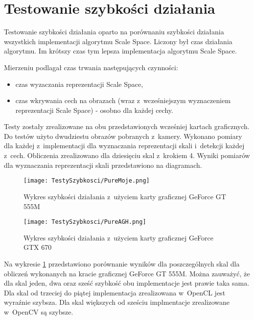 \section{Testowanie szybkości działania}
\label{sec:testSzybkosci}

Testowanie szybkości działania oparto na porównaniu szybkości działania wszystkich implementacji algorytmu Scale Space. Liczony był czas działania algorytmu. Im krótszy czas tym lepsza implementacja algorytmu Scale Space.

Mierzeniu podlagał czas trwania następujących czynności:
\begin{itemize}
\item czas wyzaczania reprezentacji Scale Space,
\item czas wkrywania cech na obrazach (wraz z~wcześniejszym wyznaczeniem reprezentacji Scale Space) - osobno dla każdej cechy.
\end{itemize}

Testy zostały zrealizowane na obu przedstawionych wcześniej kartach graficznych. Do testów użyto dwudziestu obrazów pobranych z~kamery. Wykonano pomiary dla każdej z~implementacji dla wyznaczania reprezentacji skali i~detekcji każdej z~cech. Obliczenia zrealizowano dla dziesięciu skal z~krokiem 4. Wyniki pomiarów dla wyznaczania reprezentacji skali przedstawiono na diagramach.

\begin{figure}[h]
\begin{center}
\texttt{[image: TestySzybkosci/PureMoje.png]}
\end{center}
\caption{Wykres szybkości działania z~użyciem karty graficznej GeForce GT 555M}
\label{fig:pureSzybkoscMoje}
\end{figure}

\begin{figure}[h]
\begin{center}
\texttt{[image: TestySzybkosci/PureAGH.png]}
\end{center}
\caption{Wykres szybkości działania z~użyciem karty graficznej GeForce GTX 670}
\label{fig:pureSzybkoscAGH}
\end{figure}

Na wykresie \ref{fig:pureSzybkoscMoje} przedstawiono porównanie wyników dla poszczególnych skal dla obliczeń wykonanych na kracie graficznej GeForce GT 555M. Można zauważyć, że dla skal jeden, dwa oraz sześć szybkość obu implementacje jest prawie taka sama. Dla skal od trzeciej do piątej implementacja zrealizowana w~OpenCL jest wyraźnie szybsza. Dla skal większych od sześciu implmentacje zrealizowane w~OpenCV są szybsze.

